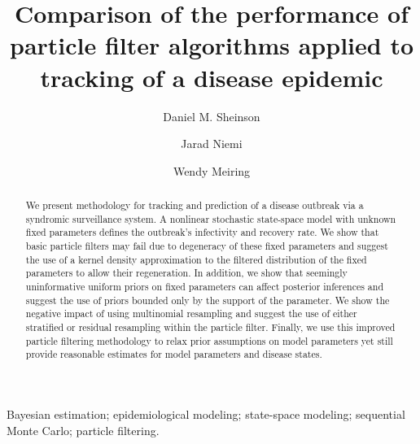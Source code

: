 \documentclass{elsarticle}
\begin{document}
\begin{frontmatter}

\title{Comparison of the performance of particle filter algorithms applied to tracking of a disease epidemic}

\author[danny]{Daniel M. Sheinson}
\author[jarad]{Jarad Niemi}
\author[wendy]{Wendy Meiring}

\address[danny]{Corresponding author -- Department of Statistics and Applied Probability, University of California--Santa Barbara, \\ Santa Barbara, CA 93106, U.S.A., sheinson@pstat.ucsb.edu, 1-847-609-7824}
\address[jarad]{Department of Statistics, Iowa State University, Ames, IA 50011, U.S.A., niemi@iastate.edu}
\address[wendy]{Department of Statistics and Applied Probability, University of California--Santa Barbara, \\ Santa Barbara, CA 93106, U.S.A., meiring@pstat.ucsb.edu}

\begin{abstract}
We present methodology for tracking and prediction of a disease outbreak via a syndromic surveillance system. A nonlinear stochastic state-space model with unknown fixed parameters defines the outbreak's infectivity and recovery rate. We show that basic particle filters may fail due to degeneracy of these fixed parameters and suggest the use of a kernel density approximation to the filtered distribution of the fixed parameters to allow their regeneration. In addition, we show that seemingly uninformative uniform priors on fixed parameters can affect posterior inferences and suggest the use of priors bounded only by the support of the parameter. We show the negative impact of using multinomial resampling and suggest the use of either stratified or residual resampling within the particle filter. Finally, we use this improved particle filtering methodology to relax prior assumptions on model parameters yet still provide reasonable estimates for model parameters and disease states.
\end{abstract}

\begin{keyword}
Bayesian estimation; epidemiological modeling; state-space modeling; sequential Monte Carlo; particle filtering.
\end{keyword}

\end{frontmatter}

\let\thefootnote\relax{}
\end{document}
